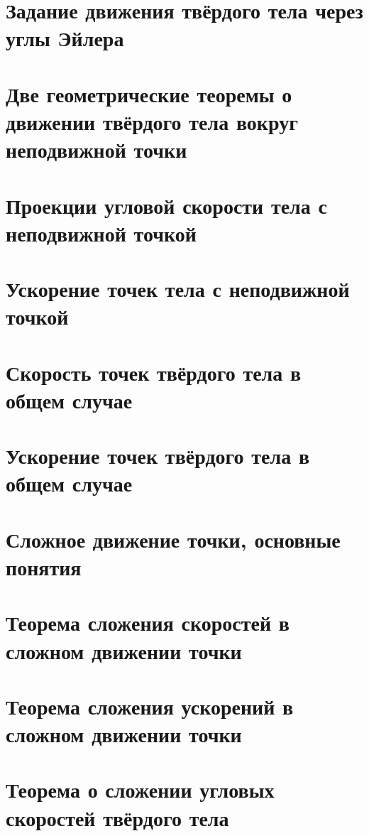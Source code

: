 \documentclass{article}
\theoremstyle{definition}
\theoremstyle{plain}
\theoremstyle{remark}
\numberwithin{equation}{section}
\begin{document}
\section{Задание движения твёрдого тела через углы Эйлера}
\pagebreak

\section{Две геометрические теоремы о движении твёрдого тела вокруг неподвижной
точки}
\pagebreak

\section{Проекции угловой скорости тела с неподвижной точкой}
\pagebreak

\section{Ускорение точек тела с неподвижной точкой}
\pagebreak

\section{Скорость точек твёрдого тела в общем случае}
\pagebreak

\section{Ускорение точек твёрдого тела в общем случае}
\pagebreak

\section{Сложное движение точки, основные понятия}
\pagebreak

\section{Теорема сложения скоростей в сложном движении точки}
\pagebreak

\section{Теорема сложения ускорений в сложном движении точки}
\pagebreak

\section{Теорема о сложении угловых скоростей твёрдого тела}
\pagebreak

\printbibliography[heading=bibintoc]
\end{document}
